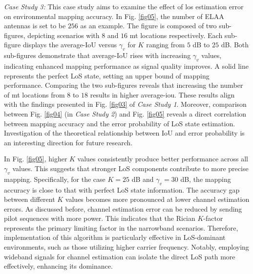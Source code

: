 \documentclass[conference, a4paper]{IEEEtran}
\newcommand{\figref}[1]{Fig. \ref{#1}}
\begin{document}
{\it Case Study 3:}
This case study aims to examine the effect of \gls{los} estimation error on environmental mapping accuracy.
In \figref{fig05}, the number of ELAA antennas is set to be $256$ as an example.
The figure is composed of two sub-figures, depicting scenarios with $8$ and $16$ \gls{mt} locations respectively.
Each sub-figure displays the average-IoU versus $\gamma_{v}$ for $K$ ranging from $5$ dB to $25$ dB.
Both sub-figures demonstrate that average-IoU rises with increasing $\gamma_{v}$ values, indicating enhanced mapping performance as signal quality improves.
A solid line represents the perfect LoS state, setting an upper bound of mapping performance.
Comparing the two sub-figures reveals that increasing the number of \gls{mt} locations from $8$ to $18$ results in higher average-\gls{iou}.
These results align with the findings presented in \figref{fig03} of \textit{Case Study 1}.
Moreover, comparison between \figref{fig04} (in \textit{Case Study 2}) and \figref{fig05} reveals a direct correlation between mapping accuracy and the error probability of LoS state estimation.
Investigation of the theoretical relationship between IoU and error probability is an interesting direction for future research.

In \figref{fig05}, higher $K$ values consistently produce better performance across all $\gamma_{v}$ values.
This suggests that stronger LoS components contribute to more precise mapping.
Specifically, for the case $K = 25$ dB and $\gamma_{v} = 30$ dB, the mapping accuracy is close to that with perfect LoS state information.
The accuracy gap between different $K$ values becomes more pronounced at lower channel estimation errors.
As discussed before, channel estimation error can be reduced by sending pilot sequences with more power.
This indicates that the Rician $K$-factor represents the primary limiting factor in the narrowband scenarios.
Therefore, implementation of this algorithm is particularly effective in LoS-dominant environments, such as those utilizing higher carrier frequency.
Notably, employing wideband signals for channel estimation can isolate the direct LoS path more effectively, enhancing its dominance.
\end{document}

